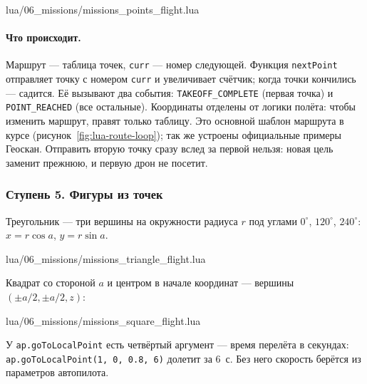 \begin{codefile}{lua/06_missions/missions_points_flight.lua}
\end{codefile}

\paragraph{Что происходит.} Маршрут --- таблица точек, \verb|curr| --- номер следующей. Функция \verb|nextPoint| отправляет точку с номером \verb|curr| и увеличивает счётчик; когда точки кончились --- садится. Её вызывают два события: \verb|TAKEOFF_COMPLETE| (первая точка) и \verb|POINT_REACHED| (все остальные). Координаты отделены от логики полёта: чтобы изменить маршрут, правят только таблицу. Это основной шаблон маршрута в курсе (рисунок~\ref{fig:lua-route-loop}); так же устроены официальные примеры Геоскан. Отправить вторую точку сразу вслед за первой нельзя: новая цель заменит прежнюю, и первую дрон не посетит.



\subsubsection*{Ступень 5. Фигуры из точек}

Треугольник --- три вершины на окружности радиуса $r$ под углами $0^\circ$, $120^\circ$, $240^\circ$: $x = r\cos a$, $y = r\sin a$.

\begin{codefile}{lua/06_missions/missions_triangle_flight.lua}
\end{codefile}

Квадрат со стороной $a$ и центром в начале координат --- вершины $(\pm a/2, \pm a/2, z)$:

\begin{codefile}{lua/06_missions/missions_square_flight.lua}
\end{codefile}

\begin{hintbox}
У \verb|ap.goToLocalPoint| есть четвёртый аргумент --- время перелёта в секундах: \verb|ap.goToLocalPoint(1, 0, 0.8, 6)| долетит за 6~с. Без него скорость берётся из параметров автопилота.
\end{hintbox}


